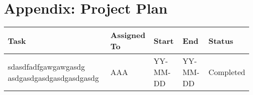 %
\chapter{Appendix: Project Plan}\label{ch:appendix:-project-plan}

\begin{tabularx}{\textwidth}{|X|l|l|l|l|}
    \hline
    Task & Assigned To & Start & End & Status \\
    \hline
    sdasdfadfgawgawgasdg asdgasdgasdgasdgasdgasdg & AAA & YY-MM-DD & YY-MM-DD & Completed \\
    \hline
\end{tabularx}

